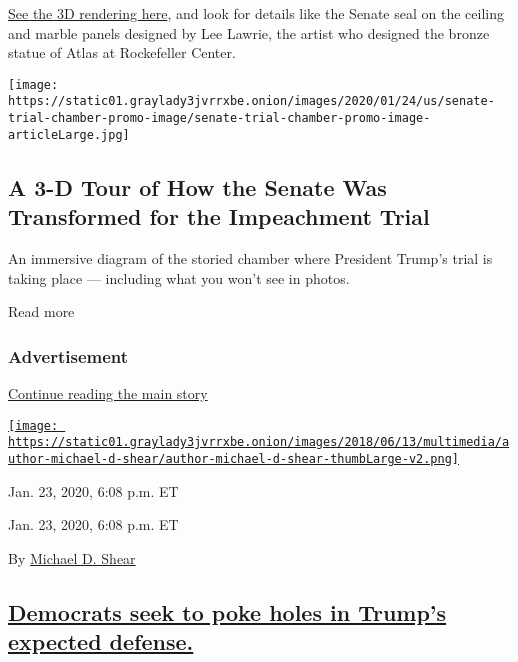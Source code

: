 \href{https://www.nytimes3xbfgragh.onion/interactive/2020/01/23/us/politics/impeachment-senate-chamber-diagram.html}{See
the 3D rendering here}, and look for details like the Senate seal on the
ceiling and marble panels designed by Lee Lawrie, the artist who
designed the bronze statue of Atlas at Rockefeller Center.

\href{https://www.nytimes3xbfgragh.onion/interactive/2020/01/23/us/politics/impeachment-senate-chamber-diagram.html}{}

\texttt{[image: https://static01.graylady3jvrrxbe.onion/images/2020/01/24/us/senate-trial-chamber-promo-image/senate-trial-chamber-promo-image-articleLarge.jpg]}

\hypertarget{a-3-d-tour-of-how-the-senate-was-transformed-for-the-impeachment-trial}{%
\subsection{A 3-D Tour of How the Senate Was Transformed for the
Impeachment
Trial}\label{a-3-d-tour-of-how-the-senate-was-transformed-for-the-impeachment-trial}}

An immersive diagram of the storied chamber where President Trump's
trial is taking place --- including what you won't see in photos.

Read more

\hypertarget{advertisement-2}{%
\subsubsection{Advertisement}\label{advertisement-2}}

\protect\hyperlink{after-dfp-ad-mid3}{Continue reading the main story}

\href{https://www.nytimes3xbfgragh.onion/by/michael-d-shear}{\texttt{[image: https://static01.graylady3jvrrxbe.onion/images/2018/06/13/multimedia/author-michael-d-shear/author-michael-d-shear-thumbLarge-v2.png]}}

Jan. 23, 2020, 6:08 p.m. ET

Jan. 23, 2020, 6:08 p.m. ET

By \href{https://www.nytimes3xbfgragh.onion/by/michael-d-shear}{Michael
D. Shear}

\hypertarget{democrats-seek-to-poke-holes-in-trumps-expected-defense}{%
\subsection{\texorpdfstring{\protect\hyperlink{democrats-strategy-trump}{Democrats
seek to poke holes in Trump's expected
defense.}}{Democrats seek to poke holes in Trump's expected defense.}}\label{democrats-seek-to-poke-holes-in-trumps-expected-defense}}

